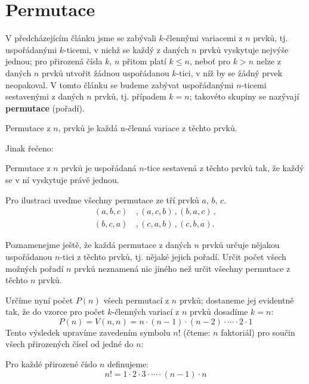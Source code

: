   \section{Permutace}\label{mai:IchapIVcsecIII}
    V předcházejícím článku jsme se zabývali \(k\)-člennými variacemi z \(n\) prvků, tj.
    uspořádanými \(k\)-ticemi, v nichž se každý z daných \(n\) prvků vyskytuje nejvýše jednou; pro
    přirozená čísla \(k\), \(n\) přitom platí \(k \leq n\), neboť pro \(k > n\) nelze z daných \(n\)
    prvků utvořit žádnou uspořádanou \(k\)-tici, v níž by se žádný prvek neopakoval. V tomto článku
    se budeme zabývat uspořádanými \(n\)-ticemi sestavenými z daných \(n\) prvků, tj. případem \(k =
    n\); takovéto skupiny se nazývají \textbf{permutace} (pořadí).
    \begin{mdframed}[style=highlight] Permutace z \(n\), prvků je každá n-členná variace z těchto
      prvků.
    \end{mdframed}
    Jinak řečeno:
    \begin{mdframed}[style=highlight] Permutace z \(n\) prvků je uspořádaná \(n\)-tice sestavená z
      těchto prvků tak, že každý se v ní vyskytuje právě jednou.
    \end{mdframed}

    Pro ilustraci uveďme všechny permutace ze tří prvků \(a\), \(b\), \(c\).
    \begin{align*}
      (a,b,c)\, &, (a,c,b)\,, (b,a,c)\,, \\
      (b,c,a)\, &, (c,a,b)\,, (c,b,a).
    \end{align*}        

    Poznamenejme ještě, že každá permutace z daných \(n\) prvků určuje nějakou uspořádanou
    \(n\)-tici z těchto prvků, tj. nějaké jejich pořadí. Určit počet všech možných pořadí \(n\)
    prvků neznamená nic jiného než určit všechny permutace z těchto \(n\) prvků. 
    
    Určíme nyní počet \(P(n)\) všech permutací z \(n\) prvků; dostaneme jej evidentně tak, že do
    vzorce pro počet \(k\)-členných variací z \(n\) prvků dosadíme \(k = n\):
    \begin{equation*}
      P(n) = V(n,n) = n\cdot (n-1)\cdot(n-2)\cdot\cdots\cdot2\cdot1
    \end{equation*}
    Tento výsledek upravíme zavedením symbolu \(n!\) (čteme: \(n\) faktoriál) pro součin všech
    přirozených čísel od jedné do \(n\):
    \begin{mdframed}[style=highlight] Pro každé přirozené číslo \(n\) definujeme:
      \begin{equation*}
        n! = 1\cdot2\cdot3\cdot\cdots\cdot(n-1)\cdot n
      \end{equation*}
    \end{mdframed}

